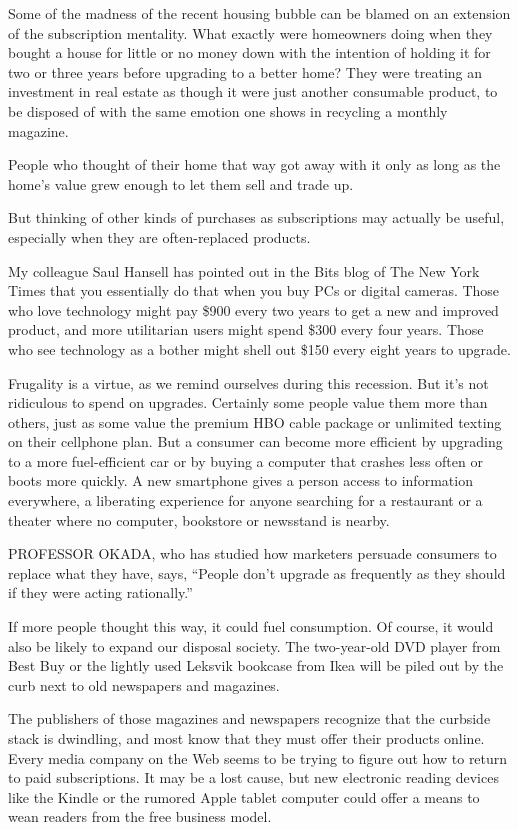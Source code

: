 ﻿\documentclass[12pt]{article}
\begin{document}
Some of the madness of the recent housing bubble can be blamed on an extension of the subscription
mentality. What exactly were homeowners doing when they bought a house for little or no money down
with the intention of holding it for two or three years before upgrading to a better home? They were
treating an investment in real estate as though it were just another consumable product, to be
disposed of with the same emotion one shows in recycling a monthly magazine.

People who thought of their home that way got away with it only as long as the home's value grew
enough to let them sell and trade up.

But thinking of other kinds of purchases as subscriptions may actually be useful, especially when
they are often-replaced products.

My colleague Saul Hansell has pointed out in the Bits blog of The New York Times that you
essentially do that when you buy PCs or digital cameras. Those who love technology might pay \$900
every two years to get a new and improved product, and more utilitarian users might spend \$300
every four years. Those who see technology as a bother might shell out \$150 every eight years to
upgrade.

Frugality is a virtue, as we remind ourselves during this recession. But it's not ridiculous to
spend on upgrades. Certainly some people value them more than others, just as some value the premium
HBO cable package or unlimited texting on their cellphone plan. But a consumer can become more
efficient by upgrading to a more fuel-efficient car or by buying a computer that crashes less often
or boots more quickly. A new smartphone gives a person access to information everywhere, a
liberating experience for anyone searching for a restaurant or a theater where no computer,
bookstore or newsstand is nearby.

PROFESSOR OKADA, who has studied how marketers persuade consumers to replace what they have, says,
``People don't upgrade as frequently as they should if they were acting rationally.''

If more people thought this way, it could fuel consumption. Of course, it would also be likely to
expand our disposal society. The two-year-old DVD player from Best Buy or the lightly used Leksvik
bookcase from Ikea will be piled out by the curb next to old newspapers and magazines.

The publishers of those magazines and newspapers recognize that the curbside stack is dwindling, and
most know that they must offer their products online. Every media company on the Web seems to be
trying to figure out how to return to paid subscriptions. It may be a lost cause, but new electronic
reading devices like the Kindle or the rumored Apple tablet computer could offer a means to wean
readers from the free business model.
\end{document}
